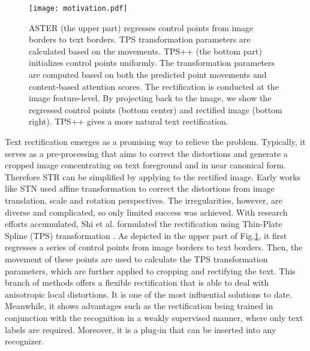 \documentclass{article}
\begin{document}
\begin{figure}[t]
\centering
\texttt{[image:  motivation.pdf]} \caption{ASTER \protect\cite{shi2018aster} (the upper part) regresses control points from image borders to text borders. TPS transformation parameters are calculated based on the movements. TPS++ (the bottom part) initializes control points uniformly. The transformation parameters are computed based on both the predicted point movements and content-based attention scores. The rectification is conducted at the image feature-level. By projecting back to the image, we show the regressed control points (bottom center) and rectified image (bottom right). TPS++ gives a more natural text rectification.}

\label{fig0:motivation}
\end{figure}

Text rectification emerges as a promising way to relieve the problem. Typically, it serves as a pre-processing that aims to correct the distortions and generate a cropped image concentrating on text foreground and in near canonical form. Therefore STR can be simplified by applying to the rectified image. Early works like STN \cite{jaderberg2015stn,liu2016starnet} used affine transformation to correct the distortions from image translation, scale and rotation perspectives. The irregularities, however, are diverse and complicated, so only limited success was achieved. With research efforts accumulated, Shi et al. \cite{shi2016robust_auto_rect} formulated the rectification using Thin-Plate Spline (TPS) transformation \cite{bookstein1989tps}. As depicted in the upper part of Fig.\ref{fig0:motivation}, it first regresses a series of control points from image borders to text borders. Then, the movement of these points are used to calculate the TPS transformation parameters, which are further applied to cropping and rectifying the text. This branch of methods \cite{shi2016robust_auto_rect,shi2018aster,yang2019symmetry,qian2021adaptive} offers a flexible rectification that is able to deal with anisotropic local distortions. It is one of the most influential solutions to date. Meanwhile, it shows advantages such as the rectification being trained in conjunction with the recognition in a weakly supervised manner, where only text labels are required. Moreover, it is a plug-in that can be inserted into any recognizer.  
\end{document}
